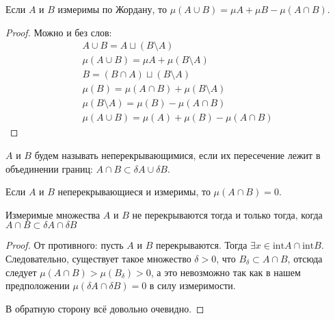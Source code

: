 \begin{Consequence}
    Если $A$ и $B$ измеримы по Жордану, то $\mu (A \cup B) = \mu A + \mu B - \mu(A \cap B)$.
\end{Consequence}
\begin{proof}
Можно и без слов:
\begin{gather}    
    A \cup B = A \sqcup (B\setminus A)\\
    \mu (A \cup B) = \mu A + \mu(B \setminus A)\\
    B = (B \cap A) \sqcup (B \setminus A)\\
    \mu(B) = \mu(A \cap B) + \mu(B \setminus A)\\
    \mu(B \setminus A) = \mu(B) - \mu(A \cap B)\\
    \mu(A \cup B) = \mu(A) + \mu(B) - \mu(A \cap B)
\end{gather}
\end{proof}
\begin{Def}
    $A$ и $B$ будем называть неперекрывающимися, если их пересечение лежит в объединении границ: $A\cap B \subset \delta A \cup \delta B$.
\end{Def}
\begin{Comment}
    Если $A$ и $B$ неперекрывающиеся и измеримы, то $\mu(A \cap B) = 0$.
\end{Comment}
\begin{Statement}
    Измеримые множества $A$ и $B$ не перекрываются тогда и только тогда, когда $A \cap B \subset \delta A \cap \delta B$
\end{Statement}
\begin{proof}
    От противного: пусть $A$ и $B$ перекрываются. Тогда $\exists x \in \mathrm{int} A \cap \mathrm{int}B$. Следовательно, существует такое множество $\delta > 0$, что $B_\delta \subset A \cap B$, отсюда следует $\mu(A \cap B) > \mu(B_\delta) > 0$, а это невозможно так как в нашем предположении $\mu (\delta A \cap \delta B) = 0$ в силу измеримости. 
    \par В обратную сторону всё довольно очевидно.
\end{proof}